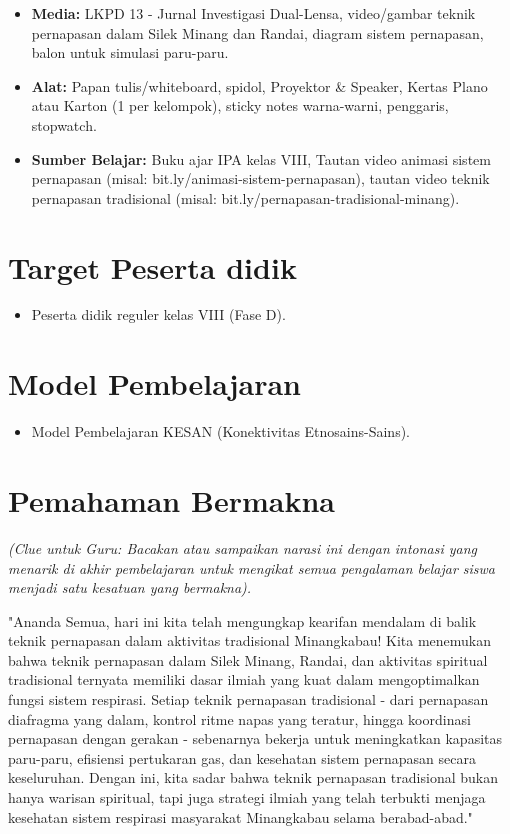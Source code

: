 \documentclass[a4paper,12pt]{article}
\begin{document}
\begin{itemize}
\item \textbf{Media:} LKPD 13 - Jurnal Investigasi Dual-Lensa, video/gambar teknik pernapasan dalam Silek Minang dan Randai, diagram sistem pernapasan, balon untuk simulasi paru-paru.
\item \textbf{Alat:} Papan tulis/whiteboard, spidol, Proyektor \& Speaker, Kertas Plano atau Karton (1 per kelompok), sticky notes warna-warni, penggaris, stopwatch.
\item \textbf{Sumber Belajar:} Buku ajar IPA kelas VIII, Tautan video animasi sistem pernapasan (misal: bit.ly/animasi-sistem-pernapasan), tautan video teknik pernapasan tradisional (misal: bit.ly/pernapasan-tradisional-minang).
\end{itemize}

\section{Target Peserta didik}

\begin{itemize}
\item Peserta didik reguler kelas VIII (Fase D).
\end{itemize}

\section{Model Pembelajaran}

\begin{itemize}
\item Model Pembelajaran KESAN (Konektivitas Etnosains-Sains).
\end{itemize}

\section{Pemahaman Bermakna}
\textit{(Clue untuk Guru: Bacakan atau sampaikan narasi ini dengan intonasi yang menarik di akhir pembelajaran untuk mengikat semua pengalaman belajar siswa menjadi satu kesatuan yang bermakna).}

\begin{tcolorbox}[sectionbox]
"Ananda Semua, hari ini kita telah mengungkap kearifan mendalam di balik teknik pernapasan dalam aktivitas tradisional Minangkabau! Kita menemukan bahwa teknik pernapasan dalam Silek Minang, Randai, dan aktivitas spiritual tradisional ternyata memiliki dasar ilmiah yang kuat dalam mengoptimalkan fungsi sistem respirasi. Setiap teknik pernapasan tradisional - dari pernapasan diafragma yang dalam, kontrol ritme napas yang teratur, hingga koordinasi pernapasan dengan gerakan - sebenarnya bekerja untuk meningkatkan kapasitas paru-paru, efisiensi pertukaran gas, dan kesehatan sistem pernapasan secara keseluruhan. Dengan ini, kita sadar bahwa teknik pernapasan tradisional bukan hanya warisan spiritual, tapi juga strategi ilmiah yang telah terbukti menjaga kesehatan sistem respirasi masyarakat Minangkabau selama berabad-abad."
\end{tcolorbox}
\end{document}

